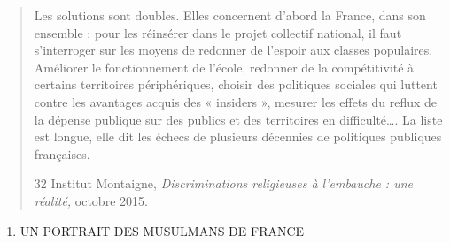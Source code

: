 \begin{quote}
Les solutions sont doubles. Elles concernent d'abord la France, dans son
ensemble : pour les réinsérer dans le projet collectif national, il faut
s'interroger sur les moyens de redonner de l'espoir aux classes
populaires. Améliorer le fonctionnement de l'école, redonner de la
compétitivité à certains territoires périphériques, choisir des
politiques sociales qui luttent contre les avantages acquis des «
insiders », mesurer les effets du reflux de la dépense publique sur des
publics et des territoires en difficulté\ldots. La liste est longue,
elle dit les échecs de plusieurs décennies de politiques publiques
françaises.

32 Institut Montaigne, \emph{Discriminations religieuses à l'embauche :
une réalité,} octobre 2015.
\end{quote}

\begin{enumerate}
\def\labelenumi{\Roman{enumi}.}
\item
  UN PORTRAIT DES MUSULMANS DE FRANCE
\end{enumerate}

